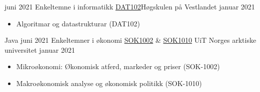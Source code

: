 

\begin{experiences}
  
  \experience
    {juni 2021}   {Enkeltemne i informatikk}{ \href{https://www.hvl.no/studier/studieprogram/emne/dat102}{DAT102}}{Høgskulen på Vestlandet}
    {januar 2021} { 
                    \begin{itemize}
                        \item Algoritmar og datastrukturar (DAT102)
                    \end{itemize}
                    }
                    {Java}
  \emptySeparator
  \simpleexperience
    {juni 2021}   {Enkeltemner i økonomi}{ \href{https://uit.no/utdanning/emner/emne?p_document_id=458115 }{SOK1002} \& \href{https://uit.no/utdanning/emner/emne?p_document_id=744166 }{SOK1010} }{UiT Norges arktiske universitet}
    {januar 2021} {
                      \begin{itemize}
                        \item Mikroøkonomi: Økonomisk atferd, markeder og priser (SOK-1002)
                        \item Makroøkonomisk analyse og økonomisk politikk (SOK-1010)
                      \end{itemize}
                    }
                    
  \emptySeparator
 
  
\end{experiences}